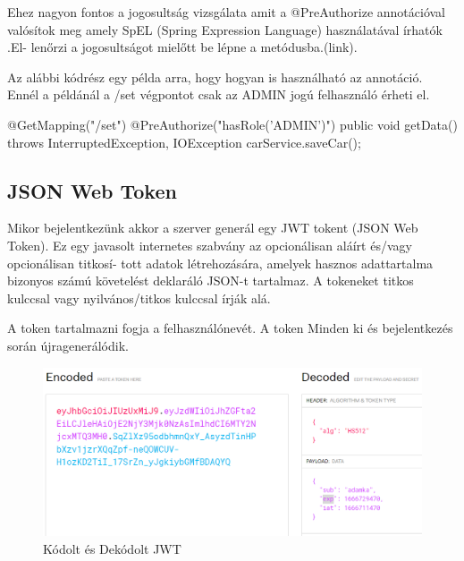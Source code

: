Ehez nagyon fontos a jogosultság vizsgálata amit a @PreAuthorize annotációval valósítok meg amely SpEL (Spring Expression Language) használatával írhatók .El-
lenőrzi a jogosultságot mielőtt be lépne a metódusba.(link).

Az alábbi kódrész egy példa arra, hogy hogyan is használható az annotáció. Ennél a példánál a /set végpontot csak az ADMIN jogú felhasználó érheti el.

\begin{java}
@GetMapping("/set")
@PreAuthorize("hasRole('ADMIN')")
    public void getData() throws InterruptedException,
     IOException {
       carService.saveCar();
    }
\end{java}
\newpage

\subsection{JSON Web Token}
Mikor bejelentkezünk akkor a szerver generál egy JWT tokent (JSON Web Token). Ez egy javasolt internetes szabvány az opcionálisan aláírt és/vagy opcionálisan titkosí-
tott adatok létrehozására, amelyek hasznos adattartalma bizonyos számú követelést deklaráló JSON-t tartalmaz. A tokeneket titkos kulccsal vagy nyilvános/titkos kulccsal írják alá.

A token tartalmazni fogja a felhasználónevét. A token Minden ki és bejelentkezés során újragenerálódik. 

\begin{figure}[h]
\centering
\includegraphics[scale=0.6]{images/jwt.io.png}
\caption{Kódolt és Dekódolt JWT}
\label{fig:JWT}
\end{figure}